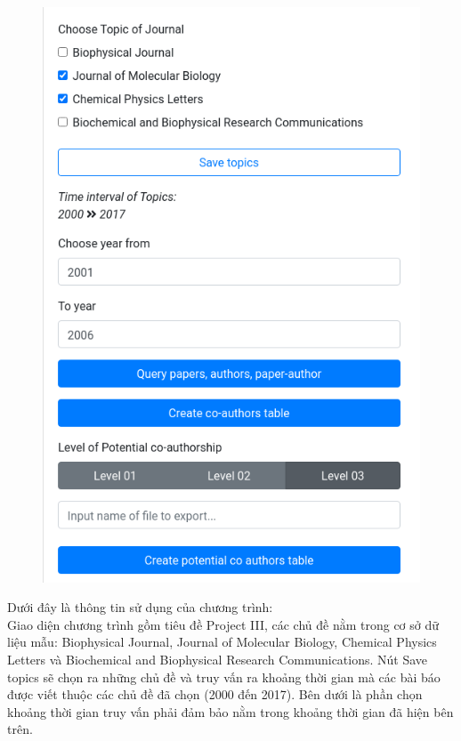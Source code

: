 \documentclass{article}
\begin{document}
\begin{figure} %
    \centering
    \includegraphics[scale=0.3]{image/overview.png}
\end{figure}

Dưới đây là thông tin sử dụng của chương trình: \\

Giao diện chương trình gồm tiêu đề Project III, các chủ đề nằm trong cơ sở dữ liệu mẫu: Biophysical Journal, Journal of Molecular Biology, Chemical Physics Letters và Biochemical and Biophysical Research Communications. Nút Save topics sẽ chọn ra những chủ đề và truy vấn ra khoảng thời gian mà các bài báo được viết thuộc các chủ đề đã chọn (2000 đến 2017). Bên dưới là phần chọn khoảng thời gian truy vấn phải đảm bảo nằm trong khoảng thời gian đã hiện bên trên. \\
\end{document}
